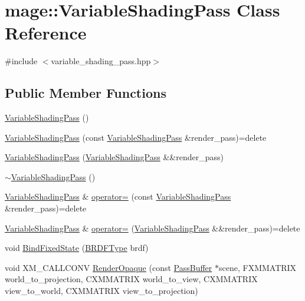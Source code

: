\hypertarget{classmage_1_1_variable_shading_pass}{}\section{mage\+:\+:Variable\+Shading\+Pass Class Reference}
\label{classmage_1_1_variable_shading_pass}


{\ttfamily \#include $<$variable\+\_\+shading\+\_\+pass.\+hpp$>$}

\subsection*{Public Member Functions}
\begin{DoxyCompactItemize}
\item 
\hyperlink{classmage_1_1_variable_shading_pass_a0c3b30167c1dcdf74daae080f2c799bc}{Variable\+Shading\+Pass} ()
\item 
\hyperlink{classmage_1_1_variable_shading_pass_a98ce8bacba3894ff29d2a13d3a645d22}{Variable\+Shading\+Pass} (const \hyperlink{classmage_1_1_variable_shading_pass}{Variable\+Shading\+Pass} \&render\+\_\+pass)=delete
\item 
\hyperlink{classmage_1_1_variable_shading_pass_afcb297b4d400a6eb119846d4c04fc3d1}{Variable\+Shading\+Pass} (\hyperlink{classmage_1_1_variable_shading_pass}{Variable\+Shading\+Pass} \&\&render\+\_\+pass)
\item 
\hyperlink{classmage_1_1_variable_shading_pass_a1af7915285b239e8e6d14eb0f926dc4a}{$\sim$\+Variable\+Shading\+Pass} ()
\item 
\hyperlink{classmage_1_1_variable_shading_pass}{Variable\+Shading\+Pass} \& \hyperlink{classmage_1_1_variable_shading_pass_ad846c4f7ffc5b795ba1c0fa03bd6c2af}{operator=} (const \hyperlink{classmage_1_1_variable_shading_pass}{Variable\+Shading\+Pass} \&render\+\_\+pass)=delete
\item 
\hyperlink{classmage_1_1_variable_shading_pass}{Variable\+Shading\+Pass} \& \hyperlink{classmage_1_1_variable_shading_pass_a28702f255ccbbabd4b6e3177acd97a8b}{operator=} (\hyperlink{classmage_1_1_variable_shading_pass}{Variable\+Shading\+Pass} \&\&render\+\_\+pass)=delete
\item 
void \hyperlink{classmage_1_1_variable_shading_pass_a3a5bf4764bdafd393c73b75939f68aa0}{Bind\+Fixed\+State} (\hyperlink{namespacemage_ae7a7a03a7b34d7e2689689bb8295cd38}{B\+R\+D\+F\+Type} brdf)
\item 
void X\+M\+\_\+\+C\+A\+L\+L\+C\+O\+NV \hyperlink{classmage_1_1_variable_shading_pass_a8878bbb68f94d75a8581fcc636fcf07c}{Render\+Opaque} (const \hyperlink{structmage_1_1_pass_buffer}{Pass\+Buffer} $\ast$scene, F\+X\+M\+M\+A\+T\+R\+IX world\+\_\+to\+\_\+projection, C\+X\+M\+M\+A\+T\+R\+IX world\+\_\+to\+\_\+view, C\+X\+M\+M\+A\+T\+R\+IX view\+\_\+to\+\_\+world, C\+X\+M\+M\+A\+T\+R\+IX view\+\_\+to\+\_\+projection)

\end{DoxyCompactItemize}
